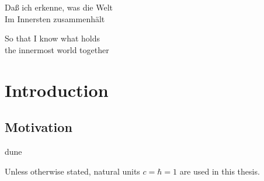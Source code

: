 \begin{savequote}[8cm]
{\frakfamily
Daß ich erkenne, was die Welt \\
Im Innersten zusammenhält
}

So that I know what holds\\
the innermost world together
\end{savequote}

\chapter{\label{ch:1-intro}Introduction} 

\minitoc

\section{Motivation}
\cite{Kayser:2005cd}
\acrfull{dune}

Unless otherwise stated, natural units $c=\hbar = 1$ are used in this thesis.

\vspace{2mm}
